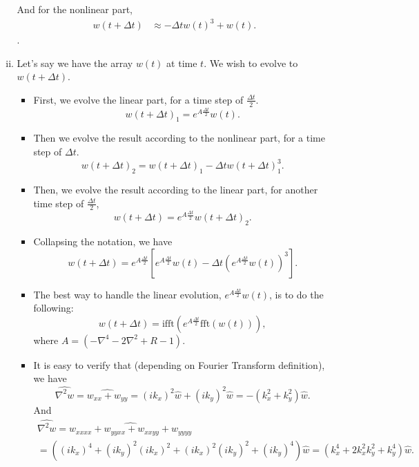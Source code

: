 \documentclass[12pt]{article}
\begin{document}
\begin{itemize}
\begin{enumerate}[(i)]
                And for the nonlinear part,
                \begin{align*}
                    w(t+\Delta t) &\approx -\Delta t w(t)^3+w(t).
                \end{align*}.
            \item
                Let's say we have the array $w(t)$ at time $t$.
                We wish to evolve to $w(t+\Delta t)$.
                \begin{itemize}
                    \item First, we evolve the linear part, for a time step of $\frac{\Delta t}{2}$.
                    \[
                        w(t+\Delta t)_1 = e^{A \frac{\Delta t}{2}}w(t).
                    \] 
                \item Then we evolve the result according to the nonlinear part, for a time step of $\Delta t$.
                    \[
                        w(t+\Delta t)_2 = w(t+\Delta t)_1 - \Delta t w(t+\Delta t)_1^3.
                    \] 
                \item Then, we evolve the result according to the linear part, for another time step of $\frac{\Delta t}{2}$,               \[
                        w(t+\Delta t) = e^{A \frac{\Delta t}{2}}w(t+\Delta t)_2.
                \] 
            \item Collapsing the notation, we have
                \[
                    w(t+\Delta t) = e^{A \frac{\Delta t}{2}}\left[e^{A \frac{\Delta t}{2}}w(t)-\Delta t \left(e^{A\frac{\Delta t}{2}}w(t)\right)^3\right].
                \]
            \item 
                The best way to handle the linear evolution, $e^{A\frac{\Delta t}{2}}w(t)$, is to do the following:
                \[
                    w(t+\Delta t) = \text{ifft}\left( e^{A \frac{\Delta t}{2}}\text{fft}(w(t))\right),
                \] 
                where $A = (-\nabla^4-2\nabla^2+R-1)$.
            \item It is easy to verify that (depending on Fourier Transform definition), we have
                \[
                    \hat{\nabla^2 w} = \hat{w_{xx} + w_{yy}} = (ik_x)^2\hat{w}+(ik_y)^2\hat{w} = -(k_x^2+k_y^2)\hat{w}.
                \] 
                And
                \begin{multline*}
                    \hat{\nabla^2 w} = \hat{w_{xxxx}+w_{yyxx}+w_{xxyy}+w_{yyyy}}\\ = \left((ik_x)^4 + (ik_y)^2(ik_x)^2 + (ik_x)^2(ik_y)^2 + (ik_y)^4\right)\hat{w} = (k_x^4 + 2k_x^2k_y^2+k_y^4)\hat{w}.

\end{multline*}
\end{itemize}
\end{enumerate}
\end{itemize}
\end{document}
